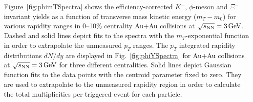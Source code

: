 \documentclass[%
 reprint,	
showpacs,
 amsmath,amssymb,
 aps,
 prc,
]{revtex4-1}
\begin{document}
Figure~\ref{fig:phimTSpectra} shows the efficiency-corrected $K^-$, $\phi$-meson and $\Xi^-$ invariant yields as a function of transverse mass kinetic energy ($m_T-m_0$) for various rapidity ranges in 0--10\% centrality Au+Au collisions at ${\sqrt{s_{\rm NN}} = \rm{3\,GeV}}$. %
Dashed and solid lines depict fits to the spectra with the $m_T$-exponential function in order to extrapolate the unmeasured $p_T$ ranges. 
The $p_T$ integrated rapidity distributions $dN/dy$ are displayed in Fig.~\ref{fig:phiYSpectra} for Au+Au collisions at ${\sqrt{s_{\rm NN}} = \rm{3\,GeV}}$ for three different centralities. %
Solid lines depict Gaussian function fits to the data points with the centroid parameter fixed to zero. They are used to extrapolate to the unmeasured rapidity region in order to calculate the total multiplicities per triggered event for each particle.
\end{document}
